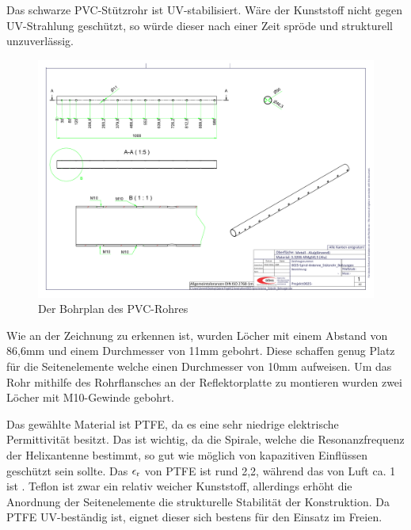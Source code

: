 Das schwarze PVC-Stützrohr ist UV-stabilisiert. Wäre der Kunststoff nicht gegen UV-Strahlung geschützt, so würde dieser nach einer Zeit spröde und strukturell unzuverlässig.

\begin{figure}[h!]
	\centering
	\includegraphics[width=\textwidth]{../ref/0025-Spiral-Antenne_St_tzrohr_Bohrungen.pdf}
	\caption{Der Bohrplan des PVC-Rohres}
	\label{fig:PVCU-Rohr-Bohrplan}
\end{figure}

Wie an der Zeichnung zu erkennen ist, wurden Löcher mit einem Abstand von 86,6mm und einem Durchmesser von 11mm gebohrt. Diese schaffen genug Platz für die Seitenelemente welche einen Durchmesser von 10mm aufweisen. Um das Rohr mithilfe des Rohrflansches an der Reflektorplatte zu montieren wurden zwei Löcher mit M10-Gewinde gebohrt. 

Das gewählte Material ist PTFE, da es eine sehr niedrige elektrische Permittivität besitzt. Das ist wichtig, da die Spirale, welche die Resonanzfrequenz der Helixantenne bestimmt, so gut wie möglich von kapazitiven Einflüssen geschützt sein sollte. Das $\epsilon\textsubscript{r}$ von PTFE ist rund 2,2, während das von Luft ca. 1 ist \cite{lipinski_polytetrafluorethylen_nodate,noauthor_dielektrizitatskonstante_nodate}. Teflon ist zwar ein relativ weicher Kunststoff, allerdings erhöht die Anordnung der Seitenelemente die strukturelle Stabilität der Konstruktion. Da PTFE UV-beständig ist, eignet dieser sich bestens für den Einsatz im Freien.

